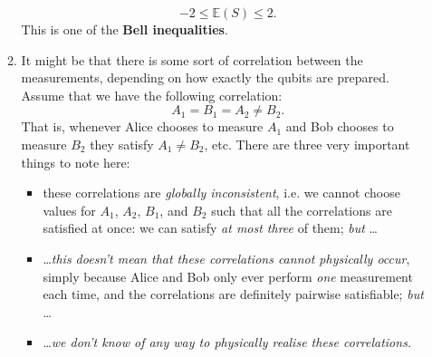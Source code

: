 \documentclass[10pt]{article}
\begin{document}
\begin{itemize}
\begin{enumerate}
\begin{equation*}
                                    -2\leqslant\mathbb{E}(S)\leqslant2.
                                \end{equation*}
                                This is one of the \textbf{Bell inequalities}.
                        \item It might be that there is some sort of correlation between the measurements, depending on how exactly the qubits are prepared.
                            Assume that we have the following correlation: $$A_1=B_1=A_2\neq B_2.$$
                            That is, whenever Alice chooses to measure $A_1$ and Bob chooses to measure $B_2$ they satisfy $A_1\neq B_2$, etc.
                            There are three very important things to note here:
                            \begin{itemize}
                                \item these correlations are \emph{globally inconsistent}, i.e. we cannot choose values for $A_1$, $A_2$, $B_1$, and $B_2$ such that all the correlations are satisfied at once: we can satisfy \emph{at most three} of them; \emph{but} \ldots
                                \item \ldots \emph{this doesn't mean that these correlations cannot physically occur}, simply because Alice and Bob only ever perform \emph{one} measurement each time, and the correlations are definitely pairwise satisfiable; \emph{but} \ldots
                                \item \ldots \emph{we don't know of any way to physically realise these correlations.}
                            \end{itemize}


\end{enumerate}
\end{itemize}
\end{document}

